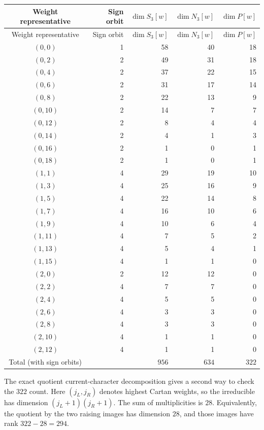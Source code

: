\begin{longtable}{@{}crrrr@{}}
\toprule Weight representative&Sign orbit&$\dim S_3[w]$&$\dim N_3[w]$&$\dim P[w]$\\\midrule\endfirsthead
\toprule Weight representative&Sign orbit&$\dim S_3[w]$&$\dim N_3[w]$&$\dim P[w]$\\\midrule\endhead
\bottomrule\endfoot
$(0,0)$ & 1 & 58 & 40 & 18\\
$(0,2)$ & 2 & 49 & 31 & 18\\
$(0,4)$ & 2 & 37 & 22 & 15\\
$(0,6)$ & 2 & 31 & 17 & 14\\
$(0,8)$ & 2 & 22 & 13 & 9\\
$(0,10)$ & 2 & 14 & 7 & 7\\
$(0,12)$ & 2 & 8 & 4 & 4\\
$(0,14)$ & 2 & 4 & 1 & 3\\
$(0,16)$ & 2 & 1 & 0 & 1\\
$(0,18)$ & 2 & 1 & 0 & 1\\
$(1,1)$ & 4 & 29 & 19 & 10\\
$(1,3)$ & 4 & 25 & 16 & 9\\
$(1,5)$ & 4 & 22 & 14 & 8\\
$(1,7)$ & 4 & 16 & 10 & 6\\
$(1,9)$ & 4 & 10 & 6 & 4\\
$(1,11)$ & 4 & 7 & 5 & 2\\
$(1,13)$ & 4 & 5 & 4 & 1\\
$(1,15)$ & 4 & 1 & 1 & 0\\
$(2,0)$ & 2 & 12 & 12 & 0\\
$(2,2)$ & 4 & 7 & 7 & 0\\
$(2,4)$ & 4 & 5 & 5 & 0\\
$(2,6)$ & 4 & 3 & 3 & 0\\
$(2,8)$ & 4 & 3 & 3 & 0\\
$(2,10)$ & 4 & 1 & 1 & 0\\
$(2,12)$ & 4 & 1 & 1 & 0\\
\midrule Total (with sign orbits)& & $956$&$634$&$322$\\
\end{longtable}
The exact quotient current-character decomposition gives a second
way to check the $322$ count. Here $(j_L,j_R)$ denotes highest Cartan
weights, so the irreducible has dimension $(j_L+1)(j_R+1)$. The sum of
multiplicities is $28$. Equivalently, the quotient by the two raising
images has dimension $28$, and those images have rank $322-28=294$.

